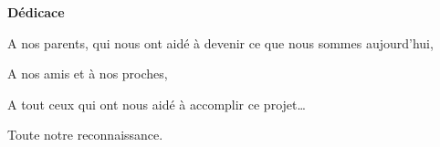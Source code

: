 \begin{center}
\LARGE\textbf{Dédicace}
\end{center}

\large
\noindent
A nos parents, qui nous ont aidé à devenir ce que nous sommes aujourd’hui,\par
\vspace{12pt}
\noindent
A nos amis et à nos proches,\par
\vspace{12pt}
\noindent
A tout ceux qui ont nous aidé à accomplir ce projet…\par
\vspace{12pt}
\noindent
Toute notre reconnaissance.

\newpage
